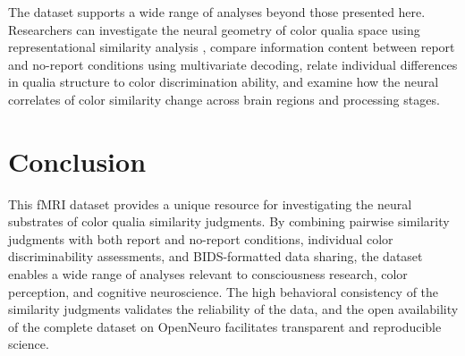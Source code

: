 \documentclass[11pt]{article}
\begin{document}
The dataset supports a wide range of analyses beyond those presented here. Researchers can investigate the neural geometry of color qualia space using representational similarity analysis \citep{kriegeskorte2008representational}, compare information content between report and no-report conditions using multivariate decoding, relate individual differences in qualia structure to color discrimination ability, and examine how the neural correlates of color similarity change across brain regions and processing stages.

\section{Conclusion}

This fMRI dataset provides a unique resource for investigating the neural substrates of color qualia similarity judgments. By combining pairwise similarity judgments with both report and no-report conditions, individual color discriminability assessments, and BIDS-formatted data sharing, the dataset enables a wide range of analyses relevant to consciousness research, color perception, and cognitive neuroscience. The high behavioral consistency of the similarity judgments validates the reliability of the data, and the open availability of the complete dataset on OpenNeuro facilitates transparent and reproducible science.



\end{document}
